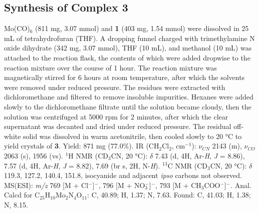 \subsection{Synthesis of Complex \textbf{3}}
Mo(CO)$_{6}$ (811 mg, 3.07 mmol) and \textbf{1} (403 mg, 1.54 mmol) were dissolved in 25 mL of tetrahydrofuran (THF). A dropping funnel charged with trimethylamine N oxide dihydrate (342 mg, 3.07 mmol), THF (10 mL), and methanol (10 mL) was attached to the reaction flask, the contents of which were added dropwise to the reaction mixture over the course of 1 hour. The reaction mixture was magnetically stirred for 6 hours at room temperature, after which the solvents were removed under reduced pressure. The residues were extracted with dichloromethane and filtered to remove insoluble impurities. Hexanes were added slowly to the dichloromethane filtrate until the solution became cloudy, then the solution was centrifuged at 5000 rpm for 2 minutes, after which the clear supernatant was decanted and dried under reduced pressure. The residual off-white solid was dissolved in warm acetonitrile, then cooled slowly to  20 °C to yield crystals of \textbf{3}. Yield: 871 mg (77.0\%). IR (CH$_{2}$Cl$_{2}$, cm$^{-1}$): $\nu_{CN}$ 2143 (m), $\nu_{CO}$ 2063 (s), 1956 (vs). $^{1}$H NMR (CD$_{3}$CN, 20 °C): $\delta$ 7.43 (d, 4H, Ar-\textit{H}, \textit{J} = 8.86), 7.57 (d, 4H, Ar-\textit{H}, \textit{J} = 8.82), 7.69 (br s, 2H, N-\textit{H}). $^{13}$C NMR (CD$_{3}$CN, 20 °C): $\delta$ 119.3, 127.2, 140.4, 151.8, isocyanide and adjacent \textit{ipso} carbons not observed. MS(ESI): \textit{m/z} 769 [M + Cl$^{-}$]$^{-}$, 796 [M + NO$_{3}^{-}$]$^{-}$, 793 [M + CH$_{3}$COO$^{-}$]$^{-}$. Anal. Calcd for C$_{25}$H$_{10}$Mo$_{2}$N$_{4}$O$_{11}$: C, 40.89; H, 1.37; N, 7.63. Found: C, 41.03; H, 1.38; N, 8.15.

